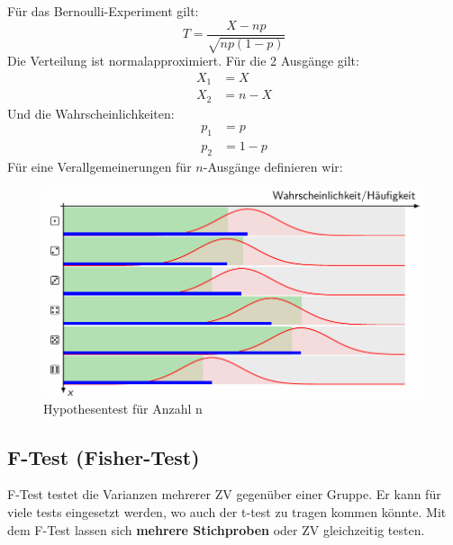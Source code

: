 \documentclass[../Main.tex]{subfiles}
\begin{document}
Für das Bernoulli-Experiment gilt:
\begin{equation*}
    T = \frac{X-np}{\sqrt{np(1-p)}}
\end{equation*}
Die Verteilung ist normalapproximiert. Für die 2 Ausgänge gilt:
\begin{equation*}
    \begin{split}
        X_1 &= X \\
        X_2 &= n-X
    \end{split}
\end{equation*}
Und die Wahrscheinlichkeiten:
\begin{equation*}
    \begin{split}
        p_1 &= p \\
        p_2 &= 1-p
    \end{split}
\end{equation*}
Für eine Verallgemeinerungen für \(n\)-Ausgänge definieren wir:

\begin{figure}[H]
    \centering
    \includegraphics[width=0.75\linewidth]{Images/hyp-n-anzahl.png}
    \caption{Hypothesentest für Anzahl n}
\end{figure}

\subsection{F-Test (Fisher-Test)}
F-Test testet die Varianzen mehrerer ZV gegenüber einer Gruppe.
Er kann für viele tests eingesetzt werden, wo auch der t-test zu tragen kommen könnte.
Mit dem F-Test lassen sich \textbf{mehrere Stichproben} oder ZV gleichzeitig testen.
\end{document}
